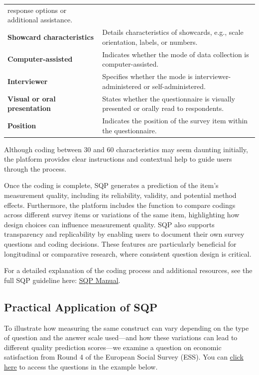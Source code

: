 \documentclass[
  letterpaper,
  DIV=11,
  numbers=noendperiod]{scrartcl}
\begin{document}
\begin{tcolorbox}
\begin{longtable}[]{@{}
  >{\raggedright\arraybackslash}p{}
  >{\raggedright\arraybackslash}p{}@{}}
response options or additional assistance. \\
\textbf{Showcard characteristics} & Details characteristics of
showcards, e.g., scale orientation, labels, or numbers. \\
\textbf{Computer-assisted} & Indicates whether the mode of data
collection is computer-assisted. \\
\textbf{Interviewer} & Specifies whether the mode is
interviewer-administered or self-administered. \\
\textbf{Visual or oral presentation} & States whether the questionnaire
is visually presented or orally read to respondents. \\
\textbf{Position} & Indicates the position of the survey item within the
questionnaire. \\
\end{longtable}

\end{tcolorbox}

Although coding between 30 and 60 characteristics may seem daunting
initially, the platform provides clear instructions and contextual help
to guide users through the process.

Once the coding is complete, SQP generates a prediction of the item's
measurement quality, including its reliability, validity, and potential
method effects. Furthermore, the platform includes the function to
compare codings across different survey items or variations of the same
item, highlighting how design choices can influence measurement quality.
SQP also supports transparency and replicability by enabling users to
document their own survey questions and coding decisions. These features
are particularly beneficial for longitudinal or comparative research,
where consistent question design is critical.

For a detailed explanation of the coding process and additional
resources, see the full SQP guideline here:
\href{https://sqp.gesis.org/static/files/UserManualSQP-3-Version-1.pdf}{SQP
Manual}.

\subsection{Practical Application of
SQP}\label{practical-application-of-sqp}

To illustrate how measuring the same construct can vary depending on the
type of question and the answer scale used---and how these variations
can lead to different quality prediction scores---we examine a question
on economic satisfaction from Round 4 of the European Social Survey
(ESS). You can
\href{https://sqp.gesis.org/user/database?a=1&si=4&ow=&la=&co=78&q=&chv=&t=Political+satisfaction&fmcf=&fccf=&_csrf=635a1b56-6247-4b74-aae7-abfd5e3d7c0e}{click
here} to access the questions in the example below.
\end{document}
